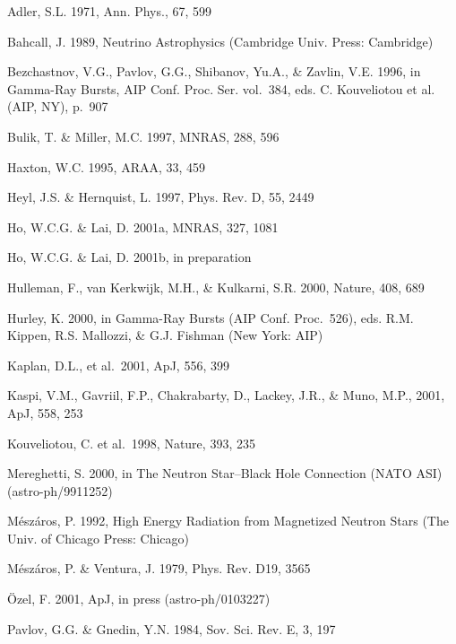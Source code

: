 \documentclass{aastex}
\begin{document}
\begin{thebibliography}{}

Adler, S.L. 1971, Ann. Phys., 67, 599

Bahcall, J. 1989, Neutrino Astrophysics (Cambridge Univ. Press: Cambridge)

Bezchastnov, V.G., Pavlov, G.G., Shibanov, Yu.A., \& Zavlin, V.E.  1996,
in Gamma-Ray Bursts, AIP Conf. Proc. Ser.  vol.~384, eds. C. Kouveliotou
et al. (AIP, NY), p.~907

Bulik, T. \& Miller, M.C. 1997, MNRAS, 288, 596

Haxton, W.C. 1995, ARAA, 33, 459

Heyl, J.S. \& Hernquist, L. 1997, Phys. Rev. D, 55, 2449

Ho, W.C.G. \& Lai, D. 2001a, MNRAS, 327, 1081

Ho, W.C.G. \& Lai, D. 2001b, in preparation

Hulleman, F., van Kerkwijk, M.H., \& Kulkarni, S.R. 2000, Nature, 408, 689

Hurley, K. 2000, in Gamma-Ray Bursts
(AIP Conf. Proc.~526), eds. R.M. Kippen, R.S. Mallozzi, \& G.J. Fishman
(New York: AIP)

Kaplan, D.L., et al.~2001, ApJ, 556, 399

Kaspi, V.M., Gavriil, F.P., Chakrabarty, D., Lackey, J.R., \& Muno, M.P., 2001,
ApJ, 558, 253

Kouveliotou, C. et al.~1998, Nature, 393, 235

Mereghetti, S. 2000, in The Neutron Star--Black Hole Connection (NATO ASI)
(astro-ph/9911252)

M\'{e}sz\'{a}ros, P. 1992, High Energy Radiation from Magnetized Neutron
Stars (The Univ. of Chicago Press: Chicago)

M\'{e}sz\'{a}ros, P. \& Ventura, J. 1979, Phys. Rev. D19, 3565

\"{O}zel, F. 2001, ApJ, in press (astro-ph/0103227)

Pavlov, G.G. \& Gnedin, Y.N. 1984, Sov. Sci. Rev. E, 3, 197


\end{thebibliography}
\end{document}
